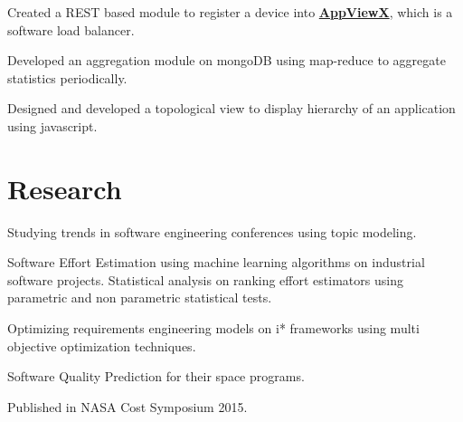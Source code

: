 \documentclass[]{bigfatnoob-resume}
\begin{document}
\begin{minipage}[t]{0.66\textwidth}
\begin{tightemize}
\item Created a REST based module to register a device into \textbf{\href{http://www.appviewx.com/}{AppViewX}}, which is a software load balancer.
\item Developed an aggregation module on mongoDB using map-reduce to aggregate statistics periodically.
\item Designed and developed a topological view to display hierarchy of an application using javascript.
\end{tightemize}
\sectionsep


\section{Research}
\begin{tightemize}
\item Studying trends in software engineering conferences using topic modeling.
\item Software Effort Estimation using machine learning algorithms on industrial software projects. Statistical analysis on ranking effort estimators using parametric and non parametric statistical tests.
\item Optimizing requirements engineering models on i* frameworks using multi objective optimization techniques.
\end{tightemize}
\sectionsep

\descript{}
\begin{tightemize}
\item Software Quality Prediction for their space programs.
\item Published in NASA Cost Symposium 2015.
\end{tightemize}
\sectionsep



\end{minipage}
\end{document}
